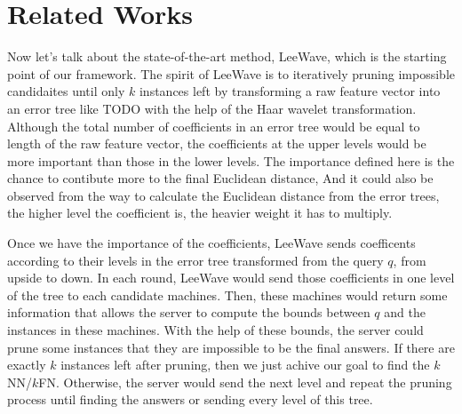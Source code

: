 \chapter{Related Works}
\label{c:related}




Now let's talk about the state-of-the-art method, LeeWave, which is the starting point of our framework. The spirit of LeeWave is to iteratively pruning impossible candidaites until only $k$ instances left by transforming a raw feature vector into an error tree like TODO with the help of the Haar wavelet transformation. Although the total number of coefficients in an error tree would be equal to length of the raw feature vector, the coefficients at the upper levels would be more important than those in the lower levels.  The importance defined here is the chance to contibute more to the final Euclidean distance,  And it could also be observed from the way to calculate the Euclidean distance from the error trees, the higher level the coefficient is, the heavier weight it has to multiply.

Once we have the importance of the coefficients, LeeWave sends coefficents according to their levels in the error tree transformed from the query $q$, from upside to down. In each round, LeeWave would send those coefficients in one level of the tree to each candidate machines.  Then, these machines would return some information that allows the server to compute the bounds between $q$ and the instances in these machines.  With the help of these bounds, the server could prune some instances that they are impossible to be the final answers.  If there are exactly $k$ instances left after pruning, then we just achive our goal to find the $k$NN/$k$FN.  Otherwise, the server would send the next level and repeat the pruning process until finding the answers or sending every level of this tree.

%
%